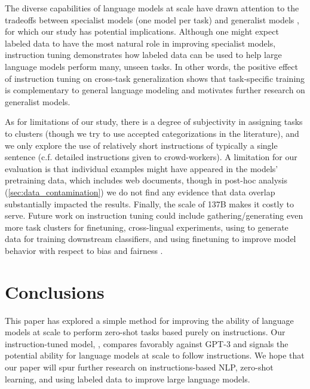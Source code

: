 The diverse capabilities of language models at scale have drawn attention to the tradeoffs between specialist models (one model per task) and generalist models \citep[one model for many tasks;][]{arivazhagan2019massively,pratap2020massively}, for which our study has potential implications. 
Although one might expect labeled data to have the most natural role in improving specialist models, instruction tuning demonstrates how labeled data can be used to help large language models perform many, unseen tasks. 
In other words, the positive effect of instruction tuning on cross-task generalization shows that task-specific training is complementary to general language modeling and motivates further research on generalist models. 

As for limitations of our study, there is a degree of subjectivity in assigning tasks to clusters (though we try to use accepted categorizations in the literature), and we only explore the use of relatively short instructions of typically a single sentence (c.f. detailed instructions given to crowd-workers). 
A limitation for our evaluation is that individual examples might have appeared in the models’ pretraining data, which includes web documents, though in post-hoc analysis (\cref{sec:data_contamination}) we do not find any evidence that data overlap substantially impacted the results.
Finally, the scale of \flan{} 137B makes it costly to serve.
Future work on instruction tuning could include gathering/generating even more task clusters for finetuning, 
cross-lingual experiments, 
using \flan{} to generate data for training downstream classifiers, 
and using finetuning to improve model behavior with respect to bias and fairness \citep{solaiman2021process}. 

\section{Conclusions}
This paper has explored a simple method for improving the ability of language models at scale to perform zero-shot tasks based purely on instructions.
Our instruction-tuned model, \flan{}, compares favorably against GPT-3 and signals the potential ability for language models at scale to follow instructions.
We hope that our paper will spur further research on instructions-based NLP, zero-shot learning, and using labeled data to improve large language models. 

\clearpage

